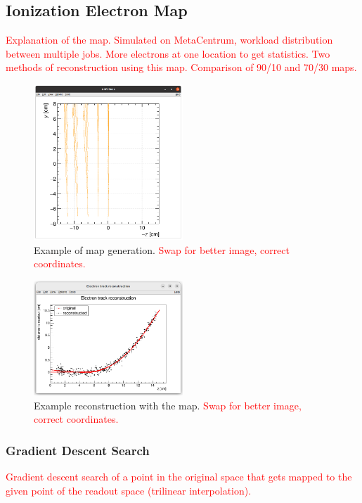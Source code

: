\documentclass[]{article}
\begin{document}
		\subsection{Ionization Electron Map}
		\label{sec:map}
			\textcolor{red}{Explanation of the map. Simulated on MetaCentrum, workload distribution between multiple jobs. More electrons at one location to get statistics. Two methods of reconstruction using this map. Comparison of 90/10 and 70/30 maps.}
					
			\begin{figure}
				\centering
				\includegraphics[width=0.5\textwidth]{map_9010_gen.png}
				\caption{Example of map generation. \textcolor{red}{Swap for better image, correct coordinates.}}
				\label{fig:map9010gen}
			\end{figure}
			
			\begin{figure}
				\centering
				\includegraphics[width=0.5\textwidth]{9010_reco.png}
				\caption{Example reconstruction with the map. \textcolor{red}{Swap for better image, correct coordinates.}}
				\label{fig:9010reco}
			\end{figure}
			
			\subsubsection{Gradient Descent Search}
				\textcolor{red}{Gradient descent search of a point in the original space that gets mapped to the given point of the readout space (trilinear interpolation).}
			
\end{document}
